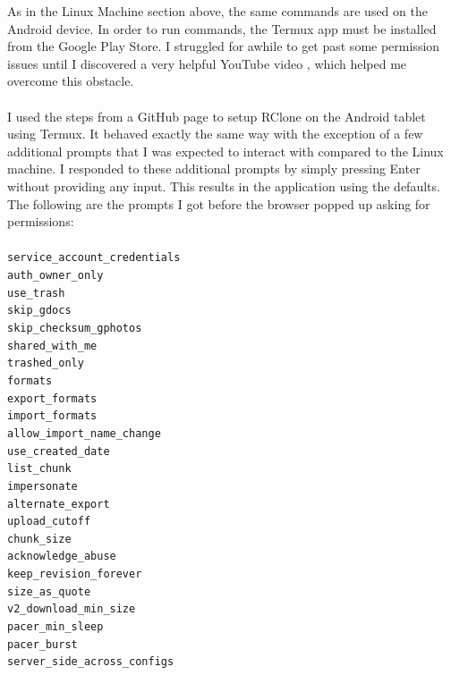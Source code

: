 As in the Linux Machine section above, the same commands are used on the Android device. In order to run commands, the Termux app must be installed from the Google Play Store. I struggled for awhile to get past some permission issues until I discovered a very helpful YouTube video \cite{youtubetermux}, which helped me overcome this obstacle. \\ \\
I used the steps from a GitHub page \cite{rclonetermux} to setup RClone on the Android tablet using Termux. It behaved exactly the same way with the exception of a few additional prompts that I was expected to interact with compared to the Linux machine. I responded to these additional prompts by simply pressing Enter without providing any input. This results in the application using the defaults. The following are the prompts I got before the browser popped up asking for permissions: \\ \\
    \verb|service_account_credentials|\\
    \verb|auth_owner_only|\\
    \verb|use_trash|\\
    \verb|skip_gdocs|\\
    \verb|skip_checksum_gphotos|\\
    \verb|shared_with_me|\\
    \verb|trashed_only|\\
    \verb|formats|\\
    \verb|export_formats|\\
    \verb|import_formats|\\
    \verb|allow_import_name_change|\\
    \verb|use_created_date|\\
    \verb|list_chunk|\\
    \verb|impersonate|\\
    \verb|alternate_export|\\
    \verb|upload_cutoff|\\
    \verb|chunk_size|\\
    \verb|acknowledge_abuse|\\
    \verb|keep_revision_forever|\\
    \verb|size_as_quote|\\
    \verb|v2_download_min_size|\\
    \verb|pacer_min_sleep|\\
    \verb|pacer_burst|\\
    \verb|server_side_across_configs|
